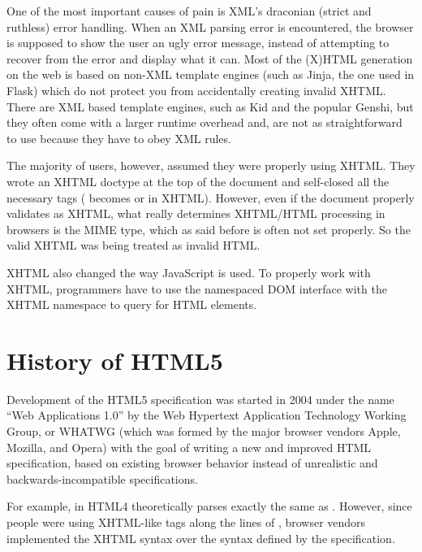 \documentclass[a4paper,12pt]{sphinxmanual}
\begin{document}
One of the most important causes of pain is XML's draconian (strict and
ruthless) error handling.  When an XML parsing error is encountered,
the browser is supposed to show the user an ugly error message, instead
of attempting to recover from the error and display what it can.  Most of
the (X)HTML generation on the web is based on non-XML template engines
(such as Jinja, the one used in Flask) which do not protect you from
accidentally creating invalid XHTML.  There are XML based template engines,
such as Kid and the popular Genshi, but they often come with a larger
runtime overhead and, are not as straightforward to use because they have
to obey XML rules.

The majority of users, however, assumed they were properly using XHTML.
They wrote an XHTML doctype at the top of the document and self-closed all
the necessary tags ( becomes  or  in XHTML).
However, even if the document properly validates as XHTML, what really
determines XHTML/HTML processing in browsers is the MIME type, which as
said before is often not set properly. So the valid XHTML was being treated
as invalid HTML.

XHTML also changed the way JavaScript is used. To properly work with XHTML,
programmers have to use the namespaced DOM interface with the XHTML
namespace to query for HTML elements.


\section{History of HTML5}
\label{htmlfaq:history-of-html5}
Development of the HTML5 specification was started in 2004 under the name
``Web Applications 1.0'' by the Web Hypertext Application Technology Working
Group, or WHATWG (which was formed by the major browser vendors Apple,
Mozilla, and Opera) with the goal of writing a new and improved HTML
specification, based on existing browser behavior instead of unrealistic
and backwards-incompatible specifications.

For example, in HTML4  theoretically parses exactly the
same as .  However, since people were using
XHTML-like tags along the lines of , browser vendors implemented
the XHTML syntax over the syntax defined by the specification.
\end{document}
